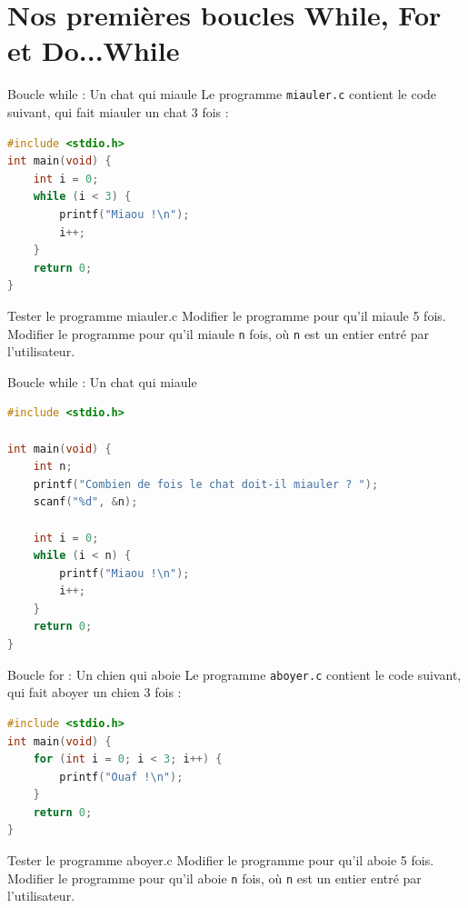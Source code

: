 
\section{Nos premières boucles While, For et Do...While}


\begin{UPSTIexercice}{Boucle while : Un chat qui miaule}
	Le programme \texttt{miauler.c} contient le code suivant, qui fait miauler un chat 3 fois :
	\begin{lstlisting}[language=c]
#include <stdio.h>
int main(void) {
    int i = 0;
    while (i < 3) {
        printf("Miaou !\n");
        i++;
    }
    return 0;
}
\end{lstlisting}
	\UPSTIetape Tester le programme miauler.c
	\UPSTIetape Modifier le programme pour qu'il miaule 5 fois.
	\UPSTIetape Modifier le programme pour qu'il miaule \texttt{n} fois, où \texttt{n} est un entier entré par l'utilisateur.
\end{UPSTIexercice}

\begin{UPSTIcorrectionP}{Boucle while : Un chat qui miaule}
	\begin{lstlisting}[language=c]
#include <stdio.h>

int main(void) {
    int n;
    printf("Combien de fois le chat doit-il miauler ? ");
    scanf("%d", &n);

    int i = 0;
    while (i < n) {
        printf("Miaou !\n");
        i++;
    }
    return 0;
}
	\end{lstlisting}
\end{UPSTIcorrectionP}



\begin{UPSTIexercice}{Boucle for : Un chien qui aboie}
	Le programme \texttt{aboyer.c} contient le code suivant, qui fait aboyer un chien 3 fois :
	\begin{lstlisting}[language=c]
#include <stdio.h>
int main(void) {
    for (int i = 0; i < 3; i++) {
        printf("Ouaf !\n");
    }
    return 0;
}
\end{lstlisting}
	\UPSTIetape Tester le programme aboyer.c
	\UPSTIetape Modifier le programme pour qu'il aboie 5 fois.
	\UPSTIetape Modifier le programme pour qu'il aboie \texttt{n} fois, où \texttt{n} est un entier entré par l'utilisateur.
\end{UPSTIexercice}

